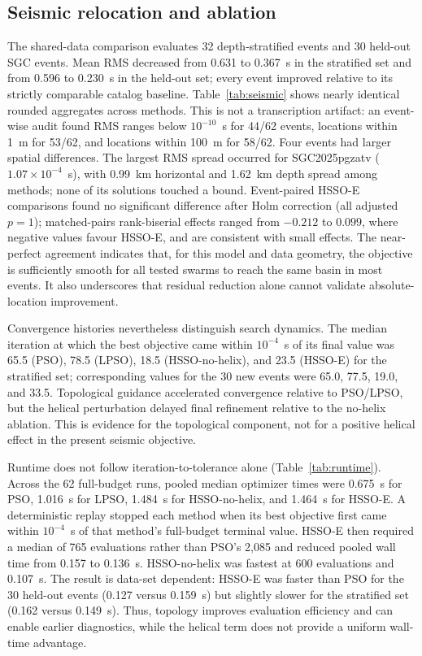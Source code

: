 \documentclass[10pt]{article}
\begin{document}
\subsection{Seismic relocation and ablation}

The shared-data comparison evaluates 32 depth-stratified events and 30 held-out SGC events. Mean RMS decreased from 0.631 to 0.367~s in the stratified set and from 0.596 to 0.230~s in the held-out set; every event improved relative to its strictly comparable catalog baseline. Table~\ref{tab:seismic} shows nearly identical rounded aggregates across methods. This is not a transcription artifact: an event-wise audit found RMS ranges below $10^{-10}$~s for 44/62 events, locations within 1~m for 53/62, and locations within 100~m for 58/62. Four events had larger spatial differences. The largest RMS spread occurred for SGC2025pgzatv ($1.07\times10^{-4}$~s), with 0.99~km horizontal and 1.62~km depth spread among methods; none of its solutions touched a bound. Event-paired HSSO-E comparisons found no significant difference after Holm correction (all adjusted $p=1$); matched-pairs rank-biserial effects ranged from $-0.212$ to $0.099$, where negative values favour HSSO-E, and are consistent with small effects. The near-perfect agreement indicates that, for this model and data geometry, the objective is sufficiently smooth for all tested swarms to reach the same basin in most events. It also underscores that residual reduction alone cannot validate absolute-location improvement.

Convergence histories nevertheless distinguish search dynamics. The median iteration at which the best objective came within $10^{-4}$~s of its final value was 65.5 (PSO), 78.5 (LPSO), 18.5 (HSSO-no-helix), and 23.5 (HSSO-E) for the stratified set; corresponding values for the 30 new events were 65.0, 77.5, 19.0, and 33.5. Topological guidance accelerated convergence relative to PSO/LPSO, but the helical perturbation delayed final refinement relative to the no-helix ablation. This is evidence for the topological component, not for a positive helical effect in the present seismic objective.

Runtime does not follow iteration-to-tolerance alone (Table~\ref{tab:runtime}). Across the 62 full-budget runs, pooled median optimizer times were 0.675~s for PSO, 1.016~s for LPSO, 1.484~s for HSSO-no-helix, and 1.464~s for HSSO-E. A deterministic replay stopped each method when its best objective first came within $10^{-4}$~s of that method's full-budget terminal value. HSSO-E then required a median of 765 evaluations rather than PSO's 2,085 and reduced pooled wall time from 0.157 to 0.136~s. HSSO-no-helix was fastest at 600 evaluations and 0.107~s. The result is data-set dependent: HSSO-E was faster than PSO for the 30 held-out events (0.127 versus 0.159~s) but slightly slower for the stratified set (0.162 versus 0.149~s). Thus, topology improves evaluation efficiency and can enable earlier diagnostics, while the helical term does not provide a uniform wall-time advantage.
\end{document}
